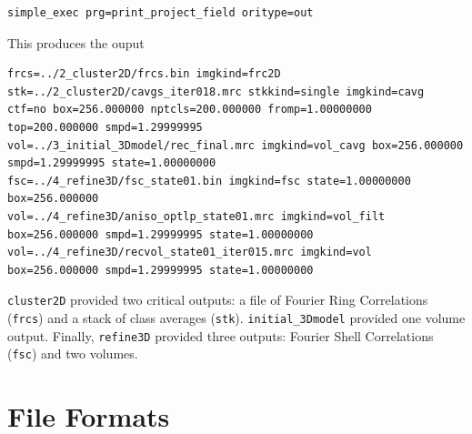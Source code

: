 \documentclass[a4paper,11pt]{article}
\newcommand{\prgname}[1]{\textcolor{NavyBlue}{\texttt{#1}}}
\begin{document}
\begin{Verbatim}[commandchars=+\[\],fontsize=\small,breaklines=true]
simple_exec prg=print_project_field oritype=out
\end{Verbatim}

\noindent{}This produces the ouput

\begin{Verbatim}[commandchars=+\[\],fontsize=\small,breaklines=true]
frcs=../2_cluster2D/frcs.bin imgkind=frc2D
stk=../2_cluster2D/cavgs_iter018.mrc stkkind=single imgkind=cavg ctf=no box=256.000000 nptcls=200.000000 fromp=1.00000000 top=200.000000 smpd=1.29999995
vol=../3_initial_3Dmodel/rec_final.mrc imgkind=vol_cavg box=256.000000 smpd=1.29999995 state=1.00000000
fsc=../4_refine3D/fsc_state01.bin imgkind=fsc state=1.00000000 box=256.000000
vol=../4_refine3D/aniso_optlp_state01.mrc imgkind=vol_filt box=256.000000 smpd=1.29999995 state=1.00000000
vol=../4_refine3D/recvol_state01_iter015.mrc imgkind=vol box=256.000000 smpd=1.29999995 state=1.00000000
\end{Verbatim}

\noindent{}\prgname{cluster2D} provided two critical outputs: a file of Fourier Ring Correlations (\texttt{frcs}) and a stack of class averages (\texttt{stk}). \prgname{initial\_3Dmodel} provided one volume output. Finally, \prgname{refine3D} provided three outputs: Fourier Shell Correlations (\texttt{fsc}) and two volumes. 






\section{File Formats}


\end{document}
